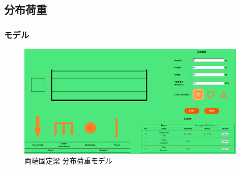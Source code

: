\documentclass{jsarticle}
\begin{document}
\newpage
\subsection{分布荷重}
\subsubsection{モデル}

\begin{figure}[H]
\begin{center}
\includegraphics[width=11cm]{fixed_distributed_model.PNG}
\caption{両端固定梁 分布荷重モデル}
\end{center}
\end{figure}
\end{document}
